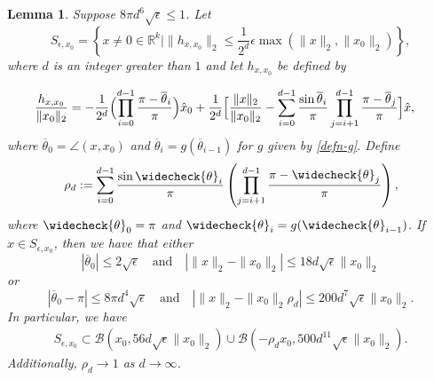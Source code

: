 \documentclass[11pt]{article}
\newtheorem{lemma}[theorem]{Lemma}
\newcommand{\R}{\mathbb{R}}
\newcommand{\eps}{\epsilon}
\newcommand{\thetabar}{\overline{\theta}}
\newcommand{\thetacheck}{\widecheck{\theta}}
\newcommand{\zetacheck}{\rho}
\newcommand{\xo}{x_0}
\newcommand{\xohat}{\hat{x}_0}
\newcommand{\Sepsxo}{S_{\eps, \xo}}
\newcommand{\hxxo}{h_{x, \xo}}
\begin{document}
\begin{lemma} \label{lemma:Seps}
Suppose $8 \pi d^6 \sqrt{\eps} \leq 1$.  Let 
\[
S_{\eps,x_0}  = \left \{ x \neq 0 \in \R^k  \mid \|\hxxo \|_2 \leq \frac{1}{2^d}\eps \max \left( \|x\|_2, \|x_0\|_2\right) \right\},
\]
where $d$ is an integer greater than $1$ and let $\hxxo$ be defined by

\begin{align}
\frac{\hxxo}{\|\xo\|_2}&=   - \frac{1}{2^d} \Bigl( \prod_{i=0}^{d-1} \frac{\pi - \thetabar_i}{\pi}  \Bigr) \xohat + \frac{1}{2^d}  \Bigl[  \frac{\|x\|_2}{\|x_0\|_2} - \sum_{i=0}^{d-1} \frac{\sin \thetabar_{i}}{\pi} \prod_{j=i+1}^{d-1} \frac{\pi - \thetabar_{j}}{\pi}   \Bigr]  \hat{x},   
\end{align}
where $\thetabar_0 = \angle(x, \xo)$ and $\thetabar_i = g(\thetabar_{i-1})$ for $g$ given by \eqref{defn-g}. 
Define
\[
\zetacheck_d := \sum_{i=0}^{d-1} \frac{\sin \thetacheck_{i}}{\pi} \left( \prod_{j=i+1}^{d-1} \frac{\pi - \thetacheck_{j} }{\pi} \right),
\]
where $\thetacheck_0= \pi$ and $\thetacheck_i = g(\thetacheck_{i-1})$.  If $x \in \Sepsxo$, then we have that either
\[
|\thetabar_0| \leq 2 \sqrt{\epsilon} \quad \text{and} \quad |\|x\|_2 - \|x_0\|_2| \leq  18 d \sqrt{\epsilon} \|x_0\|_2
\]
or
\[
|\thetabar_0 - \pi| \leq  8\pi d^4 \sqrt{\epsilon}  \quad \text{and} \quad  \left| \|x\|_2 - \|x_0\|_2 \zetacheck_d \right | \leq 200 d^7 \sqrt{\epsilon} \|x_0\|_2.
\]
In particular, we have
\begin{align}
\Sepsxo \subset \mathcal{B}(x_0, 56 d \sqrt{\eps} \|x_0\|_2  ) \cup  \mathcal{B}( -\zetacheck_d x_0, 500 d^{11} \sqrt{\eps} \|\xo\|_2).
 \label{Seps-estimate-balls}
\end{align}
Additionally, $\rho_d \to 1$ as $d \to \infty$.
\end{lemma}
\end{document}
